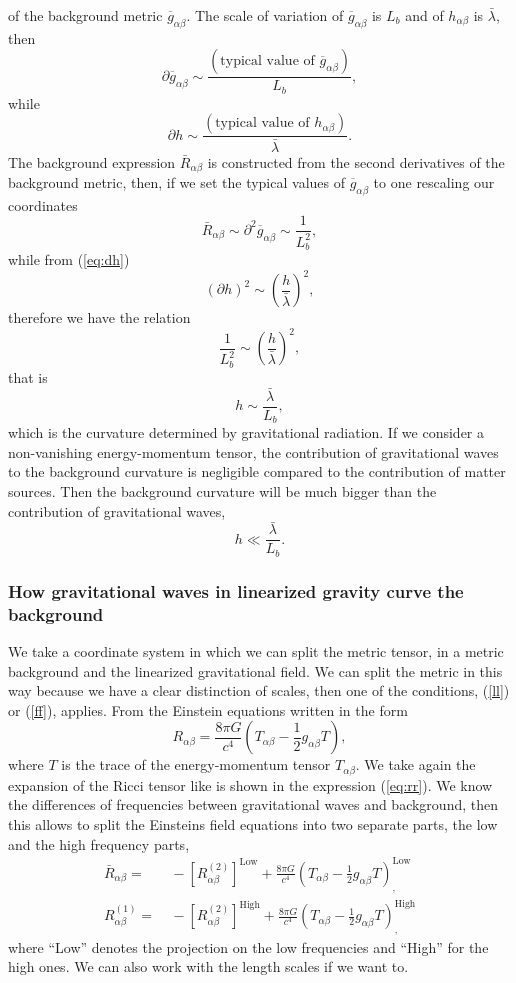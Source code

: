 of the background metric $\overline{g}_{\alpha\beta}$. The scale
of variation of $\overline{g}_{\alpha\beta}$ is $L_{b}$ and of $h_{\alpha\beta}$
is $\bar{\lambda}$, then
\[
\partial\overline{g}_{\alpha\beta}\sim\frac{(\text{typical value of }\overline{g}_{\alpha\beta})}{L_{b}},
\]
while
\begin{equation}
\partial h\sim\frac{(\text{typical value of }h_{\alpha\beta})}{\bar{\lambda}}.\label{eq:dh}
\end{equation}
The background expression $\bar{R}_{\alpha\beta}$ is constructed
from the second derivatives of the background metric, then, if we
set the typical values of $\overline{g}_{\alpha\beta}$ to one rescaling
our coordinates
\[
\bar{R}_{\alpha\beta}\sim\partial^{2}\overline{g}_{\alpha\beta}\sim\frac{1}{L_{b}^{2}},
\]
while from (\ref{eq:dh})
\[
\left(\partial h\right)^{2}\sim\left(\frac{h}{\bar{\lambda}}\right)^{2},
\]
therefore we have the relation
\[
\frac{1}{L_{b}^{2}}\sim\left(\frac{h}{\bar{\lambda}}\right)^{2},
\]
that is
\[
h\sim\frac{\bar{\lambda}}{L_{b}},
\]
which is the curvature determined by gravitational radiation. If we
consider a non-vanishing energy-momentum tensor, the contribution
of gravitational waves to the background curvature is negligible compared
to the contribution of matter sources. Then the background curvature
will be much bigger than the contribution of gravitational waves,
\[
h\ll\frac{\bar{\lambda}}{L_{b}}.
\]

\subsubsection{How gravitational waves in linearized gravity curve the background}

We take a coordinate system in which we can split the metric tensor,
in a metric background and the linearized gravitational field. We
can split the metric in this way because we have a clear distinction
of scales, then one of the conditions, (\ref{ll}) or (\ref{ff}),
applies. From the Einstein equations written in the form
\[
R_{\alpha\beta}=\frac{8\pi G}{c^{4}}\left(T_{\alpha\beta}-\frac{1}{2}g_{\alpha\beta}T\right),
\]
where $T$ is the trace of the energy-momentum tensor $T_{\alpha\beta}$.
We take again the expansion of the Ricci tensor like is shown in the
expression (\ref{eq:rr}). We know the differences of frequencies
between gravitational waves and background, then this allows to split
the Einsteins field equations into two separate parts, the low and
the high frequency parts, 
\begin{align}
\bar{R}_{\alpha\beta}= & \ -\left[R_{\alpha\beta}^{(2)}\right]^{\text{Low}}+\frac{8\pi G}{c^{4}}\left(T_{\alpha\beta}-\frac{1}{2}g_{\alpha\beta}T\right)_{,}^{\text{Low}}\label{eq:rlow}\\
R_{\alpha\beta}^{(1)}= & \ -\left[R_{\alpha\beta}^{(2)}\right]^{\text{High}}+\frac{8\pi G}{c^{4}}\left(T_{\alpha\beta}-\frac{1}{2}g_{\alpha\beta}T\right)_{,}^{\text{High}}\label{eq:rhigh}
\end{align}
where ``Low'' denotes the projection on the low frequencies and
``High'' for the high ones. We can also work with the length scales
if we want to.

